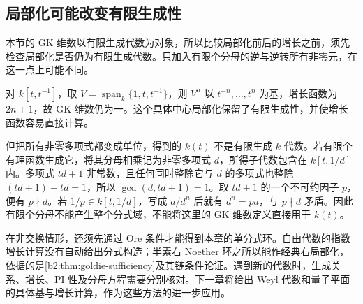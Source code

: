 \subsection{局部化可能改变有限生成性}
\label{b2:subsec:1904:03}

本节的 GK 维数以有限生成代数为对象，所以比较局部化前后的增长之前，须先检查局部化是否仍为有限生成代数。只加入有限个分母的逆与逆转所有非零元，在这一点上可能不同。

对 \(k[t,t^{-1}]\)，取 \(V=\operatorname{span}_k\{1,t,t^{-1}\}\)，则 \(V^n\) 以 \(t^{-n},\ldots,t^n\) 为基，增长函数为 \(2n+1\)，故 GK 维数仍为一。这个具体中心局部化保留了有限生成性，并使增长函数容易直接计算。

\ProseParagraphBreak
但把所有非零多项式都变成单位，得到的 \(k(t)\) 不是有限生成 \(k\) 代数。若有限个有理函数生成它，将其分母相乘记为非零多项式 \(d\)，所得子代数包含在 \(k[t,1/d]\) 内。多项式 \(td+1\) 非常数，且任何同时整除它与 \(d\) 的多项式也整除 \((td+1)-td=1\)，所以 \(\gcd(d,td+1)=1\)。取 \(td+1\) 的一个不可约因子 \(p\)，便有 \(p\nmid d\)。若 \(1/p\in k[t,1/d]\)，写成 \(a/d^n\) 后就有 \(d^n=pa\)，与 \(p\nmid d\) 矛盾。因此有限个分母不能产生整个分式域，不能将这里的 GK 维数定义直接用于 \(k(t)\)。

\ProseParagraphBreak
在非交换情形，还须先通过 Ore 条件才能得到本章的单分式环。自由代数的指数增长计算没有自动给出分式构造；半素右 Noether 环之所以能作经典右局部化，依据的是\cref{b2:thm:goldie-sufficiency}及其链条件论证。遇到新的代数时，生成关系、增长、PI 性及分母方程需要分别核对。下一章将给出 Weyl 代数和量子平面的具体基与增长计算，作为这些方法的进一步应用。
